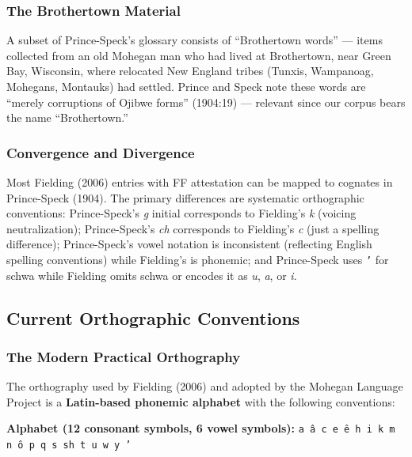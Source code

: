 \subsubsection{The Brothertown Material}

A subset of Prince-Speck's glossary consists of ``Brothertown words'' ---
items collected from an old Mohegan man who had lived at Brothertown, near
Green Bay, Wisconsin, where relocated New England tribes (Tunxis, Wampanoag,
Mohegans, Montauks) had settled. Prince and Speck note these words are
``merely corruptions of Ojibwe forms'' (1904:19) --- relevant since our
corpus bears the name ``Brothertown.''

\subsubsection{Convergence and Divergence}

Most Fielding (2006) entries with FF attestation can be mapped to cognates in
Prince-Speck (1904). The primary differences are systematic orthographic
conventions: Prince-Speck's \textit{g} initial corresponds to Fielding's
\textit{k} (voicing neutralization); Prince-Speck's \textit{ch} corresponds to
Fielding's \textit{c} (just a spelling difference); Prince-Speck's vowel
notation is inconsistent (reflecting English spelling conventions) while
Fielding's is phonemic; and Prince-Speck uses \texttt{'} for schwa while
Fielding omits schwa or encodes it as \textit{u}, \textit{a}, or \textit{i}.

\subsection{Current Orthographic Conventions}

\subsubsection{The Modern Practical Orthography}

The orthography used by Fielding (2006) and adopted by the Mohegan Language
Project is a \textbf{Latin-based phonemic alphabet} with the following
conventions:

\textbf{Alphabet (12 consonant symbols, 6 vowel symbols):}
\texttt{a â c e ê h i k m n ô p q s sh t u w y '}

